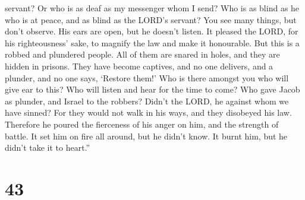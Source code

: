 servant? Or who is as deaf as my messenger whom I send? Who is as blind
as he who is at peace, and as blind as the LORD's servant? 
You see many things, but don't observe. His ears are open, but he
doesn't listen.  It pleased the LORD, for his
righteousness' sake, to magnify the law and make it honourable.
 But this is a robbed and plundered people. All of them are
snared in holes, and they are hidden in prisons. They have become
captives, and no one delivers, and a plunder, and no one says, `Restore
them!'  Who is there amongst you who will give ear to this?
Who will listen and hear for the time to come?  Who gave
Jacob as plunder, and Israel to the robbers? Didn't the LORD, he against
whom we have sinned? For they would not walk in his ways, and they
disobeyed his law.  Therefore he poured the fierceness of
his anger on him, and the strength of battle. It set him on fire all
around, but he didn't know. It burnt him, but he didn't take it to
heart.''

\hypertarget{section-41}{%
\section{43}\label{section-41}}

